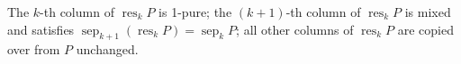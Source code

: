 \documentclass[numbers=enddot,12pt,final,onecolumn,notitlepage]{scrartcl}%
\theoremstyle{definition}
\begin{document}
\begin{itemize}
The $k$-th column of $\operatorname*{res}_{k}P$ is 1-pure; the $\left(  k+1\right)  $-th column of $\operatorname*{res}%
\nolimits_{k}P$ is mixed and satisfies $\operatorname*{sep}\nolimits_{k+1}%
\left(  \operatorname*{res}\nolimits_{k}P\right)  =\operatorname*{sep}%
\nolimits_{k}P$; all other columns of $\operatorname*{res}\nolimits_{k}P$ are
copied over from $P$ unchanged.


\end{itemize}
\end{document}
